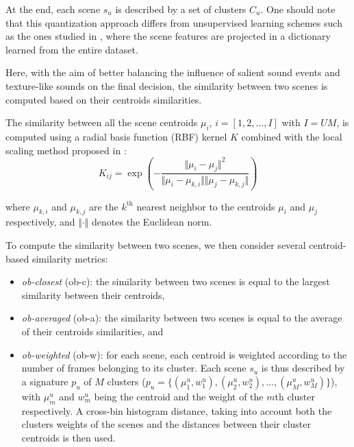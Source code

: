\documentclass[journal]{IEEEtran}
\newcommand{\ja}[1]{\textcolor{magenta}{Joakim : #1}}
\begin{document}
At the end, each scene $s_u$ is described by a set of clusters $C_u$. One should note that this quantization approach differs from unsupervised learning schemes such as the ones studied in \cite{bisot2016acoustic}, where the scene features are projected in a dictionary learned from the entire dataset.


Here, with the aim of better balancing the influence of salient sound events and texture-like sounds on the final decision, the similarity between two scenes is computed based on their centroids similarities.

The similarity between all the scene centroids $\mu_i$, $i=[1,2,\ldots,I]$ with $I=UM$, is computed using a radial basis function (RBF) kernel $K$ combined with the local scaling method proposed in \cite{selfTuneManor2004}:
\begin{equation}
\label{eq:kc}
K_{ij} = \exp\left( - \dfrac{\Vert \mu_i - \mu_j \Vert^2}{\Vert \mu_i - \mu_{k,i} \Vert \Vert \mu_j - \mu_{k,j} \Vert} \right) 
\end{equation} 

where $\mu_{k,i}$ and $\mu_{k,j}$ are the $k^{\textrm{th}}$ nearest neighbor to the centroids $\mu_i$ and $\mu_j$ respectively, and $\Vert \cdot \Vert$ denotes the Euclidean norm.

To compute the similarity between two scenes, we then consider several centroid-based similarity metrics:

\begin{itemize}
\item \emph{ob-closest} (ob-c): the similarity between two scenes is equal to the largest similarity between their centroids,
\item \emph{ob-averaged} (ob-a): the similarity between two scenes is equal to the average of their centroids similarities, and
\item \emph{ob-weighted} (ob-w): for each scene, each centroid is weighted according to the number of frames belonging to its cluster. Each scene $s_u$ is thus described by a signature $p_u$ of $M$ clusters ($p_u=\lbrace(\mu_1^u,w_1^u),(\mu_2^u,w_2^u),\ldots,(\mu_M^u,w_M^u)\rbrace$), with $\mu_m^u$ and $w_m^u$ being the centroid and the weight of the $m$th cluster respectively. A cross-bin histogram distance, taking into account both the clusters weights of the scenes and the distances between their cluster centroids is then used. 
\end{itemize}
\end{document}
